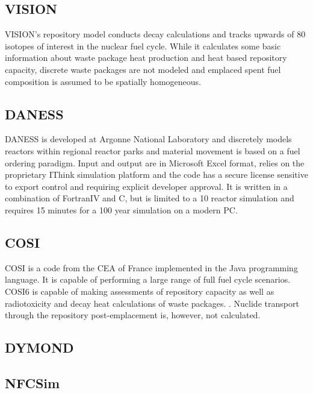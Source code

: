 \subsection{VISION} VISION's repository model conducts decay calculations and
tracks upwards of 80 isotopes of interest in the nuclear fuel cycle.
\cite{yacout_visionverifiable_2006} While it calculates some basic information 
about waste package heat production and heat based repository capacity, discrete  
waste packages are not modeled and emplaced spent fuel composition is assumed to  
be spatially homogeneous.\cite{radel_simulation_2005}
\cite{boucher_international_2010}

\subsection{DANESS} DANESS is developed at Argonne National Laboratory and
discretely models reactors within regional reactor parks and material movement
is based on a fuel ordering paradigm. Input and output are in Microsoft Excel
format, relies on the proprietary IThink simulation platform and the code has a
secure license sensitive to export control and requiring explicit developer
approval. It is written in a combination of FortranIV and C, but is limited to
a 10 reactor simulation and requires 15 minutes for a 100 year simulation on a
modern PC.\cite{yacout_daness_2011,van_den_durpel_daness:_2006} 

\subsection{COSI}

COSI is a code from the CEA of France implemented in the Java programming 
language. It is capable of performing a large range of full fuel cycle 
scenarios. COSI6 is capable of making assessments of repository capacity as 
well as radiotoxicity and decay heat calculations of waste packages. 
\cite{boucher_international_2010}. Nuclide transport through the repository 
post-emplacement is, however, not calculated. 

\subsection{DYMOND}



\subsection{NFCSim}

